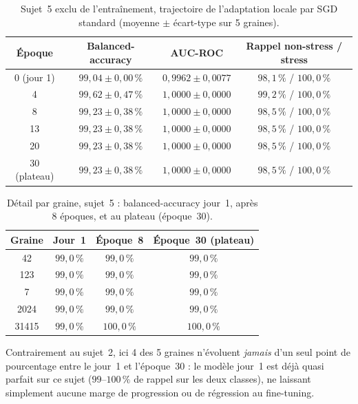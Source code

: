 \documentclass{acmart}
\begin{document}
\begin{table}[h!]
  \centering
  \small
  \caption{Sujet~5 exclu de l'entraînement, trajectoire de l'adaptation
  locale par SGD standard (moyenne $\pm$ écart-type sur 5 graines).}
  \label{tab:new_joiner_subj5}
  \begin{tabular}{cccc}
    \toprule
    Époque & Balanced-accuracy & AUC-ROC & Rappel non-stress / stress \\
    \midrule
    0 (jour 1) & $99{,}04 \pm 0{,}00\,\%$ & $0{,}9962 \pm 0{,}0077$ & $98{,}1\,\%$ / $100{,}0\,\%$ \\
    4          & $99{,}62 \pm 0{,}47\,\%$ & $1{,}0000 \pm 0{,}0000$ & $99{,}2\,\%$ / $100{,}0\,\%$ \\
    8          & $99{,}23 \pm 0{,}38\,\%$ & $1{,}0000 \pm 0{,}0000$ & $98{,}5\,\%$ / $100{,}0\,\%$ \\
    13         & $99{,}23 \pm 0{,}38\,\%$ & $1{,}0000 \pm 0{,}0000$ & $98{,}5\,\%$ / $100{,}0\,\%$ \\
    20         & $99{,}23 \pm 0{,}38\,\%$ & $1{,}0000 \pm 0{,}0000$ & $98{,}5\,\%$ / $100{,}0\,\%$ \\
    30 (plateau) & $99{,}23 \pm 0{,}38\,\%$ & $1{,}0000 \pm 0{,}0000$ & $98{,}5\,\%$ / $100{,}0\,\%$ \\
    \bottomrule
  \end{tabular}
\end{table}

\begin{table}[h!]
  \centering
  \small
  \caption{Détail par graine, sujet~5 : balanced-accuracy jour~1, après 8
  époques, et au plateau (époque~30).}
  \label{tab:new_joiner_per_seed_subj5}
  \begin{tabular}{cccc}
    \toprule
    Graine & Jour~1 & Époque~8 & Époque~30 (plateau) \\
    \midrule
    42    & $99{,}0\,\%$ & $99{,}0\,\%$ & $99{,}0\,\%$ \\
    123   & $99{,}0\,\%$ & $99{,}0\,\%$ & $99{,}0\,\%$ \\
    7     & $99{,}0\,\%$ & $99{,}0\,\%$ & $99{,}0\,\%$ \\
    2024  & $99{,}0\,\%$ & $99{,}0\,\%$ & $99{,}0\,\%$ \\
    31415 & $99{,}0\,\%$ & $100{,}0\,\%$ & $100{,}0\,\%$ \\
    \bottomrule
  \end{tabular}
\end{table}

Contrairement au sujet~2, ici 4 des 5 graines n'évoluent \emph{jamais} d'un
seul point de pourcentage entre le jour~1 et l'époque~30 : le modèle
jour~1 est déjà quasi parfait sur ce sujet ($99$--$100\,\%$ de rappel sur
les deux classes), ne laissant simplement aucune marge de progression ou de
régression au fine-tuning.
\end{document}
